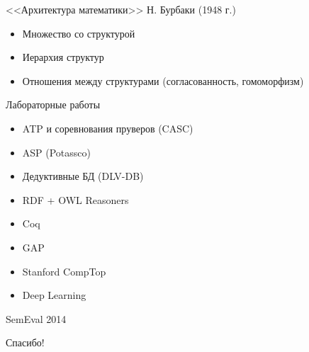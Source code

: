 \documentclass{beamer}
\begin{document}
\begin{frame}{<<Архитектура математики>> Н. Бурбаки (1948 г.)}
    \begin{itemize}
        \item Множество со структурой
        \item Иерархия структур
        \item Отношения между структурами (согласованность, гомоморфизм)
    \end{itemize}
\end{frame}

\begin{frame}{Лабораторные работы}
    \begin{itemize}
        \item ATP и соревнования пруверов (CASC)
        \item ASP (Potassco)
        \item Дедуктивные БД (DLV-DB)
        \item RDF + OWL Reasoners
        \item Coq
        \item GAP
        \item Stanford CompTop
        \item Deep Learning
    \end{itemize}
\end{frame}

\begin{frame}{SemEval 2014}
\end{frame}


\begin{frame}{}
    \thispagestyle{empty}
    \begin{center}
        {\large Спасибо!}
    \end{center}
\end{frame}


\end{document}
